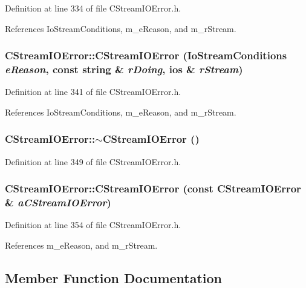 Definition at line 334 of file CStream\-IOError.h.

References Io\-Stream\-Conditions, m\_\-e\-Reason, and m\_\-r\-Stream.
\subsubsection{\setlength{\rightskip}{0pt plus 5cm}CStream\-IOError::CStream\-IOError ({\bf Io\-Stream\-Conditions} {\em e\-Reason}, const string \& {\em r\-Doing}, ios \& {\em r\-Stream})\hspace{0.3cm}{\tt  [inline]}}\label{classCStreamIOError_a1}




Definition at line 341 of file CStream\-IOError.h.

References Io\-Stream\-Conditions, m\_\-e\-Reason, and m\_\-r\-Stream.
\subsubsection{\setlength{\rightskip}{0pt plus 5cm}CStream\-IOError::$\sim$CStream\-IOError ()\hspace{0.3cm}{\tt  [inline]}}\label{classCStreamIOError_a2}




Definition at line 349 of file CStream\-IOError.h.
\subsubsection{\setlength{\rightskip}{0pt plus 5cm}CStream\-IOError::CStream\-IOError (const CStream\-IOError \& {\em a\-CStream\-IOError})\hspace{0.3cm}{\tt  [inline]}}\label{classCStreamIOError_a3}




Definition at line 354 of file CStream\-IOError.h.

References m\_\-e\-Reason, and m\_\-r\-Stream.

\subsection{Member Function Documentation}
